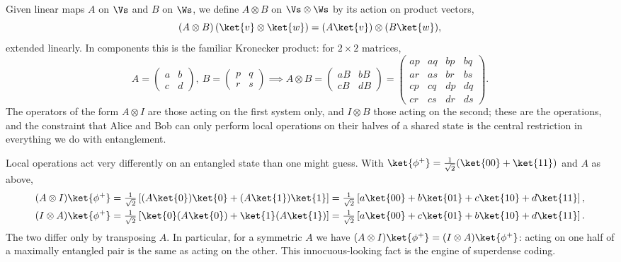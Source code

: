 Given linear maps $A$ on $\Vs$ and $B$ on $\Ws$, we define $A \otimes B$ on $\Vs\otimes\Ws$ by its action on product vectors,
$$(A\otimes B)\left(\ket{v}\otimes\ket{w}\right) = (A\ket{v})\otimes(B\ket{w}),$$
extended linearly. In components this is the familiar Kronecker product: for $2\times2$ matrices,
$$A = \begin{pmatrix} a & b \\ c & d\end{pmatrix},\ B = \begin{pmatrix} p & q \\ r & s\end{pmatrix} \implies A \otimes B = \begin{pmatrix} aB & bB \\ cB & dB\end{pmatrix} = \begin{pmatrix} ap & aq & bp & bq \\ ar & as & br & bs \\ cp & cq & dp & dq \\ cr & cs & dr & ds \end{pmatrix}.$$
The operators of the form $A \otimes I$ are those acting on the first system only, and $I \otimes B$ those acting on the second; these are the  operations, and the constraint that Alice and Bob can only perform local operations on their halves of a shared state is the central restriction in everything we do with entanglement.

\begin{example}
	Local operations act very differently on an entangled state than one might guess. With $\ket{\phi^+} = \tfrac{1}{\sqrt2}(\ket{00}+\ket{11})$ and $A$ as above,
	\begin{align*}
		(A\otimes I)\ket{\phi^+} &= \tfrac{1}{\sqrt2}\left[(A\ket{0})\ket{0} + (A\ket{1})\ket{1}\right] = \tfrac{1}{\sqrt2}\left[a\ket{00} + b\ket{01} + c\ket{10} + d\ket{11}\right], \\
		(I\otimes A)\ket{\phi^+} &= \tfrac{1}{\sqrt2}\left[\ket{0}(A\ket{0}) + \ket{1}(A\ket{1})\right] = \tfrac{1}{\sqrt2}\left[a\ket{00} + c\ket{01} + b\ket{10} + d\ket{11}\right].
	\end{align*}
	The two differ only by transposing $A$. In particular, for a symmetric $A$ we have $(A\otimes I)\ket{\phi^+} = (I\otimes A)\ket{\phi^+}$: acting on one half of a maximally entangled pair is the same as acting on the other. This innocuous-looking fact is the engine of superdense coding.
\end{example}

